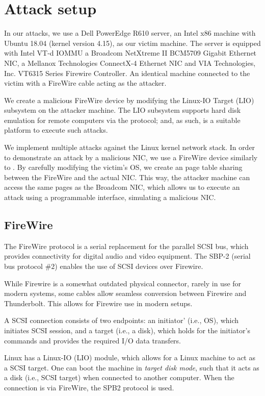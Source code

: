 \section{Attack setup}\label{sec:attack_setup}

In our attacks, we use a Dell PowerEdge R610 server, an Intel x86 machine with Ubuntu 18.04 (kernel version 4.15), as our victim machine. The server is equipped with Intel VT-d IOMMU a Broadcom NetXtreme II BCM5709 Gigabit Ethernet NIC, a Mellanox Technologies ConnectX-4 Ethernet NIC and VIA Technologies, Inc. VT6315 Series Firewire Controller. An identical machine connected to the victim with a FireWire cable acting as the attacker. 

We create a malicious FireWire device by modifying the Linux-IO Target (LIO) subsystem on the attacker machine. The LIO subsystem supports hard disk emulation for remote computers via the \spb{} protocol; and, as such, is a suitable platform to execute such attacks. 

We implement multiple attacks against the Linux kernel network stack. In order to demonstrate an attack by a malicious NIC, we use a FireWire device similarly to \cite{SLND10}. By carefully modifying the victim’s OS, we create an \iova{} page table sharing between the FireWire and the actual NIC. This way, the attacker machine can access the same pages as the Broadcom NIC, which allows us to execute an attack using a programmable interface, simulating a malicious NIC.

\subsection{FireWire}

The FireWire protocol is a serial replacement for the parallel SCSI bus, which provides connectivity for digital audio and video equipment. The SBP-2 (serial bus protocol $\#2$) enables the use of SCSI devices over Firewire. 

While Firewire is a somewhat outdated physical connector, rarely in use for modern systems, some cables allow seamless conversion between Firewire and Thunderbolt. This allows for Firewire use in modern setups.

A SCSI connection consists of two endpoints: an initiator' (i.e., OS), which initiates SCSI session, and a target (i.e., a disk), which holds for the initiator's commands and provides the required I/O data transfers. 

Linux has a Linux-IO (LIO) module, which allows for a Linux machine to act as a SCSI target. One can boot the machine in \emph{target disk mode}, such that it acts as a disk (i.e., SCSI target) when connected to another computer. When the connection is via FireWire, the SPB2 protocol is used.

